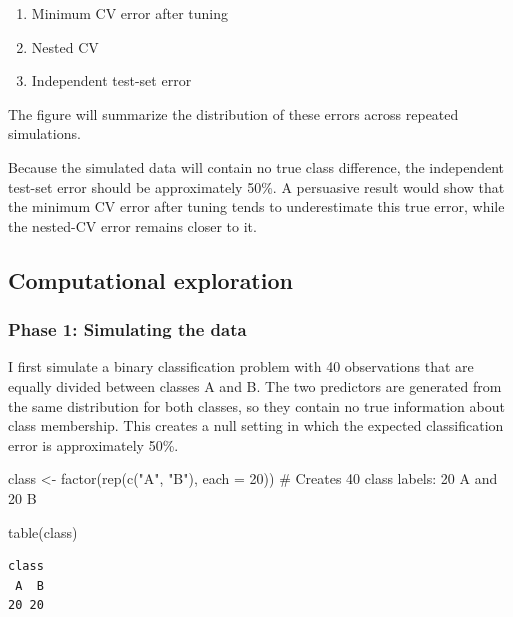 \documentclass[
  letterpaper,
  DIV=11,
  numbers=noendperiod]{scrreprt}
\newenvironment{Shaded}{\begin{snugshade}}{\end{snugshade}}
\newcommand{\AttributeTok}[1]{\textcolor[rgb]{0.40,0.45,0.13}{#1}}
\newcommand{\CommentTok}[1]{\textcolor[rgb]{0.37,0.37,0.37}{#1}}
\newcommand{\DecValTok}[1]{\textcolor[rgb]{0.68,0.00,0.00}{#1}}
\newcommand{\FunctionTok}[1]{\textcolor[rgb]{0.28,0.35,0.67}{#1}}
\newcommand{\NormalTok}[1]{\textcolor[rgb]{0.00,0.23,0.31}{#1}}
\newcommand{\OtherTok}[1]{\textcolor[rgb]{0.00,0.23,0.31}{#1}}
\newcommand{\StringTok}[1]{\textcolor[rgb]{0.13,0.47,0.30}{#1}}
\providecommand{\tightlist}{%
  \setlength{\itemsep}{0pt}\setlength{\parskip}{0pt}}
\begin{document}
\begin{enumerate}
\def\labelenumi{\arabic{enumi}.}
\tightlist
\item
  Minimum CV error after tuning
\item
  Nested CV
\item
  Independent test-set error
\end{enumerate}

The figure will summarize the distribution of these errors across
repeated simulations.

Because the simulated data will contain no true class difference, the
independent test-set error should be approximately 50\%. A persuasive
result would show that the minimum CV error after tuning tends to
underestimate this true error, while the nested-CV error remains closer
to it.

\subsection{Computational exploration}\label{computational-exploration}

\subsubsection{Phase 1: Simulating the
data}\label{phase-1-simulating-the-data}

I first simulate a binary classification problem with 40 observations
that are equally divided between classes A and B. The two predictors are
generated from the same distribution for both classes, so they contain
no true information about class membership. This creates a null setting
in which the expected classification error is approximately 50\%.

\begin{Shaded}
\begin{Highlighting}[]
\NormalTok{class }\OtherTok{\textless{}{-}} \FunctionTok{factor}\NormalTok{(}\FunctionTok{rep}\NormalTok{(}\FunctionTok{c}\NormalTok{(}\StringTok{"A"}\NormalTok{, }\StringTok{"B"}\NormalTok{), }\AttributeTok{each =} \DecValTok{20}\NormalTok{)) }\CommentTok{\# Creates 40 class labels: 20 A and 20 B}

\FunctionTok{table}\NormalTok{(class)}
\end{Highlighting}
\end{Shaded}

\begin{verbatim}
class
 A  B 
20 20 
\end{verbatim}
\end{document}
